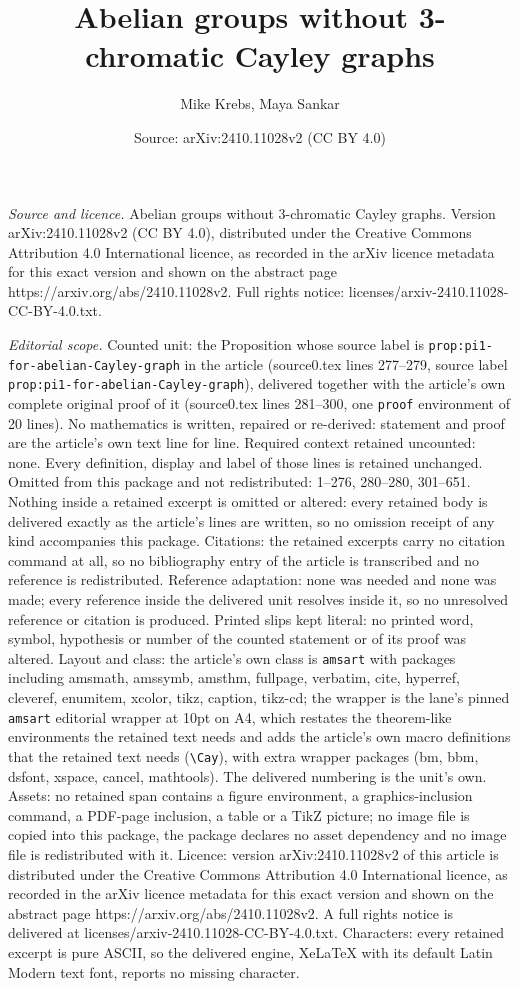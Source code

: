 \documentclass[10pt,a4paper]{amsart}
\title[Abelian groups without 3-chromatic Cayley graphs]{Abelian groups without 3-chromatic Cayley graphs}
\author{Mike Krebs, Maya Sankar}
\date{Source: arXiv:2410.11028v2 (CC BY 4.0)}
\begin{document}
\maketitle

\noindent\emph{Source and licence.} Abelian groups without 3-chromatic Cayley graphs. Version arXiv:2410.11028v2 (CC BY 4.0), distributed under the Creative Commons Attribution 4.0 International licence, as recorded in the arXiv licence metadata for this exact version and shown on the abstract page https://arxiv.org/abs/2410.11028v2. Full rights notice: licenses/arxiv-2410.11028-CC-BY-4.0.txt.\par\smallskip

\noindent\textit{Editorial scope.} Counted unit: the Proposition whose source label is \texttt{prop:pi1-for-abelian-Cayley-graph} in the article (source0.tex lines 277--279, source label \texttt{prop:pi1-for-abelian-Cayley-graph}), delivered together with the article's own complete original proof of it (source0.tex lines 281--300, one \texttt{proof} environment of 20 lines). No mathematics is written, repaired or re-derived: statement and proof are the article's own text line for line. Required context retained uncounted: none. Every definition, display and label of those lines is retained unchanged. Omitted from this package and not redistributed: 1--276, 280--280, 301--651. Nothing inside a retained excerpt is omitted or altered: every retained body is delivered exactly as the article's lines are written, so no omission receipt of any kind accompanies this package. Citations: the retained excerpts carry no citation command at all, so no bibliography entry of the article is transcribed and no reference is redistributed. Reference adaptation: none was needed and none was made; every reference inside the delivered unit resolves inside it, so no unresolved reference or citation is produced. Printed slips kept literal: no printed word, symbol, hypothesis or number of the counted statement or of its proof was altered. Layout and class: the article's own class is \texttt{amsart} with packages including amsmath, amssymb, amsthm, fullpage, verbatim, cite, hyperref, cleveref, enumitem, xcolor, tikz, caption, tikz-cd; the wrapper is the lane's pinned \texttt{amsart} editorial wrapper at 10pt on A4, which restates the theorem-like environments the retained text needs and adds the article's own macro definitions that the retained text needs (\texttt{\textbackslash Cay}), with extra wrapper packages (bm, bbm, dsfont, xspace, cancel, mathtools). The delivered numbering is the unit's own. Assets: no retained span contains a figure environment, a graphics-inclusion command, a PDF-page inclusion, a table or a TikZ picture; no image file is copied into this package, the package declares no asset dependency and no image file is redistributed with it. Licence: version arXiv:2410.11028v2 of this article is distributed under the Creative Commons Attribution 4.0 International licence, as recorded in the arXiv licence metadata for this exact version and shown on the abstract page https://arxiv.org/abs/2410.11028v2. A full rights notice is delivered at licenses/arxiv-2410.11028-CC-BY-4.0.txt. Characters: every retained excerpt is pure ASCII, so the delivered engine, XeLaTeX with its default Latin Modern text font, reports no missing character.
\end{document}
